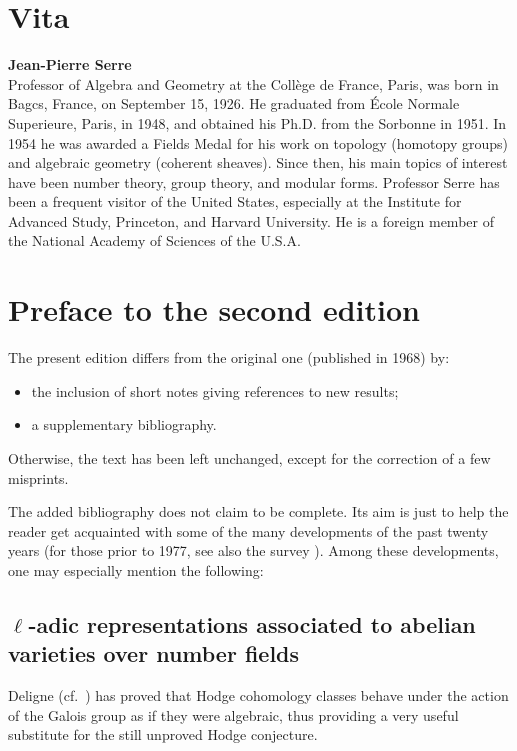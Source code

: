 \chapter*{Vita}
{\bfseries\large Jean-Pierre Serre}\\
Professor of Algebra and Geometry at the Collège de France, Paris, was born in
Bagcs, France, on September 15, 1926. He graduated from École Normale
Superieure, Paris, in 1948, and obtained his Ph.D. from the Sorbonne in 1951.
In 1954 he was awarded a Fields Medal for his work on topology (homotopy
groups) and algebraic geometry (coherent sheaves). Since then, his main topics
of interest have been number theory, group theory, and modular forms. Professor
Serre has been a frequent visitor of the United States, especially at the
Institute for Advanced Study, Princeton, and Harvard University. He is a
foreign member of the National Academy of Sciences of the U.S.A.

\chapter*{Preface to the second edition}
The present edition differs from the original one (published in 1968) by:
\begin{itemize}
	\item the inclusion of short notes giving references to new results;
	\item a supplementary bibliography.
\end{itemize}
Otherwise, the text has been left unchanged, except for the correction of a few
misprints.

The added bibliography does not claim to be complete. Its aim is just to help
the reader get acquainted with some of the many developments of the past twenty
years (for those prior to 1977, see also the survey \cite{78}). Among these
developments, one may especially mention the following:

\section*{\texorpdfstring{$\ell$}{ℓ}-adic representations associated to abelian
varieties over number fields}
Deligne (cf.\ \cite{52}) has proved that Hodge cohomology classes behave under
the action of the Galois group as if they were algebraic, thus providing a very
useful substitute for the still unproved Hodge conjecture.

